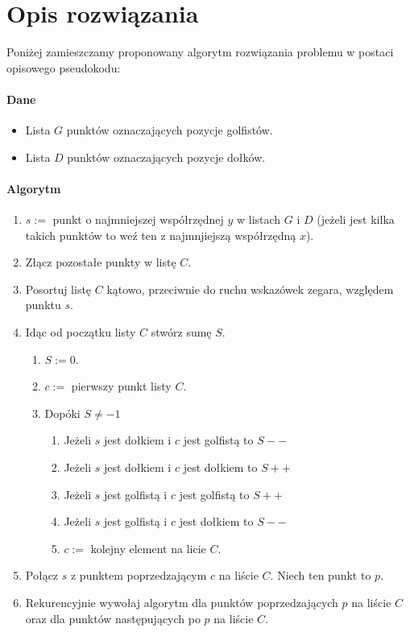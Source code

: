 \documentclass{article}
\begin{document}
\section{Opis rozwiązania}

Poniżej zamieszczamy proponowany algorytm rozwiązania problemu w postaci opisowego pseudokodu:

\paragraph{Dane}
\begin{itemize}
\item Lista $G$ punktów oznaczających pozycje golfistów.
\item Lista $D$ punktów oznaczających pozycje dołków.
\end{itemize}

\paragraph{Algorytm}
\begin{enumerate}
\item $s :=$ punkt o najmniejszej współrzędnej $y$ w listach $G$ i $D$ (jeżeli jest kilka takich punktów to weź ten z najmnjiejszą współrzędną $x$).
\item Złącz pozostałe punkty w listę $C$.
\item Posortuj listę $C$ kątowo, przeciwnie do ruchu wskazówek zegara, względem punktu $s$.
\item Idąc od początku listy $C$ stwórz sumę $S$.
	\begin{enumerate}
	\item $S := 0$.
	\item $c :=$ pierwszy punkt listy $C$.
	\item Dopóki $S\neq-1$
		\begin{enumerate}
		\item Jeżeli $s$ jest dołkiem i $c$ jest golfistą to $S--$
		\item Jeżeli $s$ jest dołkiem i $c$ jest dołkiem to $S++$
		\item Jeżeli $s$ jest golfistą i $c$ jest golfistą to $S++$
		\item Jeżeli $s$ jest golfistą i $c$ jest dołkiem to $S--$
		\item $c:=$ kolejny element na licie $C$.
		\end{enumerate}
	\end{enumerate}
\item Połącz $s$ z punktem poprzedzającym $c$ na liście $C$. Niech ten punkt to $p$.
\item Rekurencyjnie wywołaj algorytm dla punktów poprzedzających $p$ na liście $C$ oraz dla punktów następujących po $p$ na liście $C$.
\end{enumerate}
\end{document}
